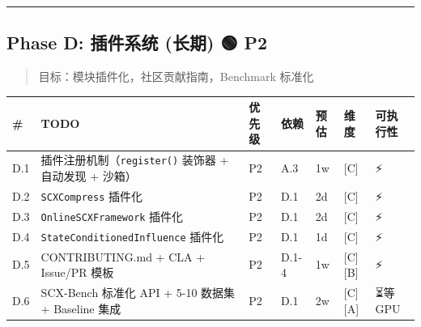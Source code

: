 \documentclass[
  12pt,
]{ctexart}
\begin{document}
\begin{center}\rule{0.5\linewidth}{0.5pt}\end{center}

\subsection{Phase D: 插件系统 (长期) 🟢
P2}\label{phase-d-ux63d2ux4ef6ux7cfbux7edf-ux957fux671f-p2}

\begin{quote}
目标：模块插件化，社区贡献指南，Benchmark 标准化
\end{quote}

\begin{longtable}[]{@{}
  >{\raggedright\arraybackslash}p{}
  >{\raggedright\arraybackslash}p{}
  >{\raggedright\arraybackslash}p{}
  >{\raggedright\arraybackslash}p{}
  >{\raggedright\arraybackslash}p{}
  >{\raggedright\arraybackslash}p{}
  >{\raggedright\arraybackslash}p{}@{}}
\toprule\noalign{}
\begin{minipage}[b]{\linewidth}\raggedright
\#
\end{minipage} & \begin{minipage}[b]{\linewidth}\raggedright
TODO
\end{minipage} & \begin{minipage}[b]{\linewidth}\raggedright
优先级
\end{minipage} & \begin{minipage}[b]{\linewidth}\raggedright
依赖
\end{minipage} & \begin{minipage}[b]{\linewidth}\raggedright
预估
\end{minipage} & \begin{minipage}[b]{\linewidth}\raggedright
维度
\end{minipage} & \begin{minipage}[b]{\linewidth}\raggedright
可执行性
\end{minipage} \\
\midrule\noalign{}
\endhead
\bottomrule\noalign{}
\endlastfoot
D.1 & 插件注册机制（\texttt{register()} 装饰器 + 自动发现 + 沙箱） & P2
& A.3 & 1w & {[}C{]} & ⚡ \\
D.2 & \texttt{SCXCompress} 插件化 & P2 & D.1 & 2d & {[}C{]} & ⚡ \\
D.3 & \texttt{OnlineSCXFramework} 插件化 & P2 & D.1 & 2d & {[}C{]} &
⚡ \\
D.4 & \texttt{StateConditionedInfluence} 插件化 & P2 & D.1 & 1d &
{[}C{]} & ⚡ \\
D.5 & CONTRIBUTING.md + CLA + Issue/PR 模板 & P2 & D.1-4 & 1w &
{[}C{]}{[}B{]} & ⚡ \\
D.6 & SCX-Bench 标准化 API + 5-10 数据集 + Baseline 集成 & P2 & D.1 & 2w
& {[}C{]}{[}A{]} & ⏳等 GPU \\
\end{longtable}
\end{document}
